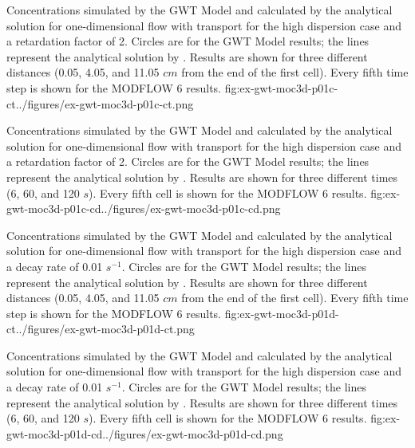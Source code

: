 \begin{StandardFigure}{
                                     Concentrations simulated by the \mf GWT Model and calculated by the analytical solution for one-dimensional flow with transport for the high dispersion case and a retardation factor of 2.  Circles are for the GWT Model results; the lines represent the analytical solution by \cite{wexler1992}.  Results are shown for three different distances (0.05, 4.05, and 11.05 $cm$ from the end of the first cell).  Every fifth time step is shown for the MODFLOW 6 results.
                                     }{fig:ex-gwt-moc3d-p01c-ct}{../figures/ex-gwt-moc3d-p01c-ct.png}
\end{StandardFigure}            

\begin{StandardFigure}{
                                     Concentrations simulated by the \mf GWT Model and calculated by the analytical solution for one-dimensional flow with transport for the high dispersion case and a retardation factor of 2.  Circles are for the GWT Model results; the lines represent the analytical solution by \cite{wexler1992}.  Results are shown for three different times (6, 60, and 120 $s$).  Every fifth cell is shown for the MODFLOW 6 results.
                                     }{fig:ex-gwt-moc3d-p01c-cd}{../figures/ex-gwt-moc3d-p01c-cd.png}
\end{StandardFigure}            

\begin{StandardFigure}{
                                     Concentrations simulated by the \mf GWT Model and calculated by the analytical solution for one-dimensional flow with transport for the high dispersion case and a decay rate of 0.01 $s^{-1}$.  Circles are for the GWT Model results; the lines represent the analytical solution by \cite{wexler1992}.  Results are shown for three different distances (0.05, 4.05, and 11.05 $cm$ from the end of the first cell).  Every fifth time step is shown for the MODFLOW 6 results.
                                     }{fig:ex-gwt-moc3d-p01d-ct}{../figures/ex-gwt-moc3d-p01d-ct.png}
\end{StandardFigure}            

\begin{StandardFigure}{
                                     Concentrations simulated by the \mf GWT Model and calculated by the analytical solution for one-dimensional flow with transport for the high dispersion case and a decay rate of 0.01 $s^{-1}$.  Circles are for the GWT Model results; the lines represent the analytical solution by \cite{wexler1992}.  Results are shown for three different times (6, 60, and 120 $s$).  Every fifth cell is shown for the MODFLOW 6 results.
                                     }{fig:ex-gwt-moc3d-p01d-cd}{../figures/ex-gwt-moc3d-p01d-cd.png}
\end{StandardFigure}            

